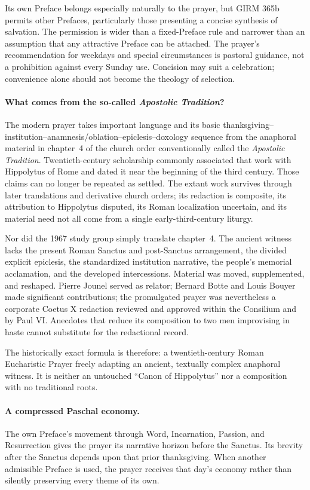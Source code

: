 Its own Preface belongs especially naturally to the prayer, but GIRM 365b permits other Prefaces, particularly those presenting a concise synthesis of salvation. The permission is wider than a fixed-Preface rule and narrower than an assumption that any attractive Preface can be attached. The prayer's recommendation for weekdays and special circumstances is pastoral guidance, not a prohibition against every Sunday use. Concision may suit a celebration; convenience alone should not become the theology of selection.

\paragraph{What comes from the so-called \emph{Apostolic Tradition}?}
The modern prayer takes important language and its basic thanksgiving--institution--anamnesis/oblation--epiclesis--doxology sequence from the anaphoral material in chapter~4 of the church order conventionally called the \emph{Apostolic Tradition}. Twentieth-century scholarship commonly associated that work with Hippolytus of Rome and dated it near the beginning of the third century. Those claims can no longer be repeated as settled. The extant work survives through later translations and derivative church orders; its redaction is composite, its attribution to Hippolytus disputed, its Roman localization uncertain, and its material need not all come from a single early-third-century liturgy.

Nor did the 1967 study group simply translate chapter~4. The ancient witness lacks the present Roman Sanctus and post-Sanctus arrangement, the divided explicit epiclesis, the standardized institution narrative, the people's memorial acclamation, and the developed intercessions. Material was moved, supplemented, and reshaped. Pierre Jounel served as relator; Bernard Botte and Louis Bouyer made significant contributions; the promulgated prayer was nevertheless a corporate Coetus X redaction reviewed and approved within the Consilium and by Paul VI\@. Anecdotes that reduce its composition to two men improvising in haste cannot substitute for the redactional record.

The historically exact formula is therefore: a twentieth-century Roman Eucharistic Prayer freely adapting an ancient, textually complex anaphoral witness. It is neither an untouched ``Canon of Hippolytus'' nor a composition with no traditional roots.

\paragraph{A compressed Paschal economy.}
The own Preface's movement through Word, Incarnation, Passion, and Resurrection gives the prayer its narrative horizon before the Sanctus. Its brevity after the Sanctus depends upon that prior thanksgiving. When another admissible Preface is used, the prayer receives that day's economy rather than silently preserving every theme of its own.

